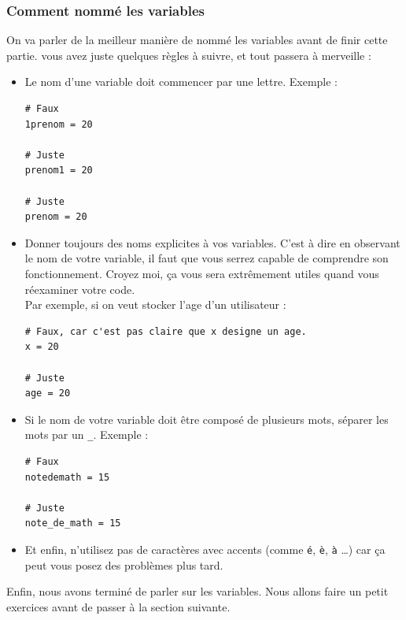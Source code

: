 \documentclass[12pt]{article}
\newcommand{\code}[1]{\colorbox{light-gray}{\texttt{#1}}}
\begin{document}
        \subsubsection{Comment nommé les variables}
            On va parler de la meilleur manière de nommé les variables avant de finir cette partie. 
            vous avez juste quelques règles à suivre, et tout passera à merveille :
            \begin{itemize}
                \item Le nom d'une variable doit commencer par une lettre. Exemple :
                    \begin{lstlisting}[style=code]
# Faux
1prenom = 20 

# Juste
prenom1 = 20 

# Juste
prenom = 20
                    \end{lstlisting}

                \item Donner toujours des noms explicites à vos variables. C'est à dire en observant le nom de votre
                    variable, il faut que vous serrez capable de comprendre son fonctionnement. Croyez moi, ça vous 
                    sera extrêmement utiles quand vous réexaminer votre code. \\Par exemple, si on veut stocker 
                    l'age d'un utilisateur :
                    \begin{lstlisting}[style=code]
# Faux, car c'est pas claire que x designe un age.
x = 20

# Juste
age = 20
                    \end{lstlisting}

                \item Si le nom de votre variable doit être composé de plusieurs mots, séparer les mots par un \code{\_}.
                    Exemple :
                    \begin{lstlisting}[style=code]
# Faux
notedemath = 15

# Juste
note_de_math = 15
                    \end{lstlisting}

                \item Et enfin, n'utilisez pas de caractères avec accents (comme \code{é}, \code{è}, \code{à} \ldots)
                    car ça peut vous posez des problèmes plus tard.
            \end{itemize}

            Enfin, nous avons terminé de parler sur les variables. Nous allons faire un petit exercices avant de passer
            à la section suivante.
\end{document}
